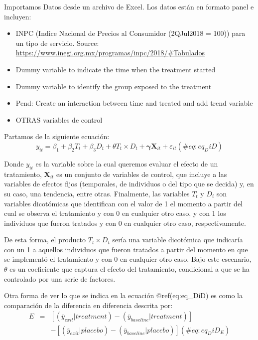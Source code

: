 \documentclass[
]{book}
\begin{document}
Importamos Datos desde un archivo de Excel. Los datos están en formato panel e incluyen:

\begin{itemize}
    \item INPC (Indice Nacional de Precios al Consumidor (2QJul2018 = 100)) para un tipo de servicio. Source: \url{https://www.inegi.org.mx/programas/inpc/2018/#Tabulados}

    \item Dummy variable to indicate the time when the treatment started

    \item Dummy variable to identify the group exposed to the treatment

    \item Pend: Create an interaction between time and treated and add trend variable

    \item OTRAS variables de control
\end{itemize}

Partamos de la siguiente ecuación:
\begin{equation}
    y_{it} = \beta_1 + \beta_2 T_t + \beta_3 D_t + \theta T_t \times D_t + \boldsymbol{\gamma} \mathbf{X}_{it} + \varepsilon_{it}
    (\#eq:eq_DiD)
\end{equation}

Donde \(y_{it}\) es la variable sobre la cual queremos evaluar el efecto de un tratamiento, \(\mathbf{X}_{it}\) es un conjunto de variables de control, que incluye a las variables de efectos fijos (temporales, de individuos o del tipo que se decida) y, en su caso, una tendencia, entre otras. Finalmente, las variables \(T_t\) y \(D_i\) son variables dicotómicas que identifican con el valor de 1 el momento a partir del cual se observa el tratamiento y con 0 en cualquier otro caso, y con 1 los individuos que fueron tratados y con 0 en cualquier otro caso, respectivamente.

De esta forma, el producto \(T_t \times D_t\) sería una variable dicotómica que indicaría con un 1 a aquellos individuos que fueron tratados a partir del momento en que se implementó el tratamiento y con 0 en cualquier otro caso. Bajo este escenario, \(\theta\) es un coeficiente que captura el efecto del tratamiento, condicional a que se ha controlado por una serie de factores.

Otra forma de ver lo que se indica en la ecuación @ref(eq:eq\_DiD) es como la comparación de la diferencia en diferencia descrita por:
\begin{eqnarray}
    E & = & [ (\overline{y}_{exit} | treatment) - (\overline{y}_{baseline} | treatment) ] \nonumber \\  
    &  & - [ (\overline{y}_{exit} | placebo) - (\overline{y}_{baseline} | placebo) ]
    (\#eq:eq_DiD_E)
\end{eqnarray}
\end{document}
